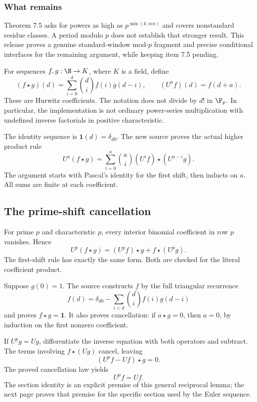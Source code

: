 \subsubsection*{What remains}
Theorem 7.5 asks for powers as high as $p^{\min(k,mn)}$ and covers nonstandard residue classes. A period modulo $p$ does not establish that stronger result. This release proves a genuine standard-window mod-$p$ fragment and precise conditional interfaces for the remaining argument, while keeping item 7.5 pending.

\par\medskip
{}
For sequences $f,g:\N\to K$, where $K$ is a field, define
\[
 (f\star g)(d)=\sum_{i=0}^{d}\binom di f(i)g(d-i),
 \qquad (U^a f)(d)=f(d+a).
\]
These are Hurwitz coefficients. The notation does not divide by $d!$ in $\F_p$. In particular, the implementation is not ordinary power-series multiplication with undefined inverse factorials in positive characteristic.

The identity sequence is $\mathbf1(d)=\delta_{d0}$. The new source proves the actual higher product rule
\[
 U^a(f\star g)=\sum_{i=0}^{a}\binom ai
       (U^i f)\star(U^{a-i}g).
\]
The argument starts with Pascal's identity for the first shift, then inducts on $a$. All sums are finite at each coefficient.

\subsection*{The prime-shift cancellation}
For prime $p$ and characteristic $p$, every interior binomial coefficient in row $p$ vanishes. Hence
\[
 U^p(f\star g)=(U^pf)\star g+f\star(U^pg).
\]
The first-shift rule has exactly the same form. Both are checked for the literal coefficient product.

Suppose $g(0)=1$. The source constructs $f$ by the full triangular recurrence
\[
 f(d)=\delta_{d0}-\sum_{i<d}\binom di f(i)g(d-i)
\]
and proves $f\star g=\mathbf1$. It also proves cancellation: if $a\star g=0$, then $a=0$, by induction on the first nonzero coefficient.

If $U^pg=Ug$, differentiate the inverse equation with both operators and subtract. The terms involving $f\star(Ug)$ cancel, leaving
\[
 (U^pf-Uf)\star g=0.
\]
The proved cancellation law yields
\[
 \boxed{U^pf=Uf.}
\]
The section identity is an explicit premise of this general reciprocal lemma; the next page proves that premise for the specific section used by the Euler sequence.

